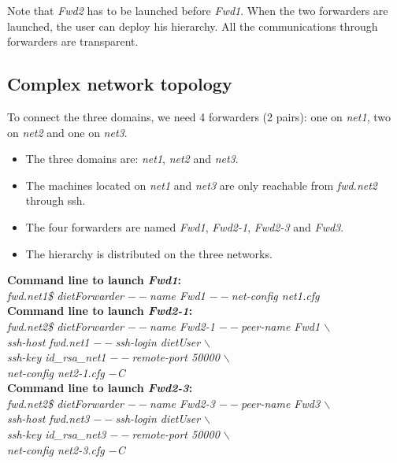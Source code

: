 Note that \textit{Fwd2} has to be launched before \textit{Fwd1}.
When the two forwarders are launched, the user can deploy his \diet
hierarchy. All the communications through  \diet forwarders are
transparent.

\subsection{Complex network topology}
To connect the three domains, we need 4 forwarders (2 pairs): one on
\textit{net1}, two on \textit{net2} and one on \textit{net3}.
\begin{itemize}
\item The three domains are: \textit{net1}, \textit{net2} and
  \textit{net3}.
\item The machines located on \textit{net1} and \textit{net3} are only
  reachable from \textit{fwd.net2} through ssh.
\item The four forwarders are named \textit{Fwd1}, \textit{Fwd2-1},
  \textit{Fwd2-3} and \textit{Fwd3}.
\item The \diet hierarchy is distributed on the three networks.\\
\end{itemize}

\noindent\textbf{Command line to launch \textit{Fwd1}: }\\
{\small \it fwd.net1\$ dietForwarder {\tiny$--$}name Fwd1
  {\tiny$--$}net-config net1.cfg}\\[2mm]

\noindent\textbf{Command line to launch \textit{Fwd2-1}: }\\
{\small \it fwd.net2\$ dietForwarder {\tiny$--$}name Fwd2-1
  {\tiny$--$}peer-name Fwd1 $\backslash$\\
  \hspace*{4.2cm}{\tiny$--$}ssh-host fwd.net1 {\tiny$--$}ssh-login
  dietUser $\backslash$\\
  \hspace*{4.2cm}{\tiny$--$}ssh-key id\_rsa\_net1
  {\tiny$--$}remote-port 50000 $\backslash$\\
  \hspace*{4.2cm}{\tiny$--$}net-config net2-1.cfg {\tiny$-$}C}\\[2mm]

\noindent\textbf{Command line to launch \textit{Fwd2-3}: }\\
{\small \it fwd.net2\$ dietForwarder {\tiny$--$}name Fwd2-3
  {\tiny$--$}peer-name Fwd3 $\backslash$\\
  \hspace*{4.2cm}{\tiny$--$}ssh-host fwd.net3 {\tiny$--$}ssh-login
  dietUser $\backslash$\\
  \hspace*{4.2cm}{\tiny$--$}ssh-key id\_rsa\_net3
  {\tiny$--$}remote-port 50000 $\backslash$\\
  \hspace*{4.2cm}{\tiny$--$}net-config net2-3.cfg {\tiny$-$}C}\\[2mm]

